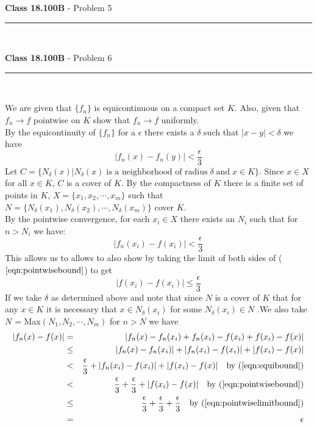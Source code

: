 \documentclass[11pt,reqno]{article}
\begin{document}
\vspace{15pt}
\begin{flushleft} 
\textbf{Class 18.100B} - Problem 5\\
\rule{500pt}{1pt}\\
\end{flushleft} 


\vspace{15pt}
\begin{flushleft} 
\textbf{Class 18.100B} - Problem 6\\
\rule{500pt}{1pt}\\
\end{flushleft} 

We are given that $\{ f_n \}$ is equicontinuous on a compact set $K$. Also, given that $f_n \to f$ pointwise on $K$ show that $f_n \to f$ uniformly.\\
By the equicontinuity of $\{ f_n \}$ for a $\epsilon$ there exists a $\delta$ such that $|x - y| < \delta$ we have
\begin{equation} 
|f_n(x) - f_n(y)| < \frac{\epsilon}{3} \label{eqn:equibound}
\end{equation}
Let $C = \{ N_\delta(x) | N_\delta(x) \; \text{is a neighborhood of radius} \; \delta \; \text{and} \; x \in K \} $. Since $x \in X$ for all $x \in K$, $C$ is a cover of $K$. By the compactness of $K$ there is a finite set of points in $K$, $X = \{ x_1, x_2, \cdots ,x_m \}$ such that $N = \{ N_\delta(x_1), N_\delta(x_2), \cdots, N_\delta(x_m) \}$ cover $K$. \\
By the pointwise convergence, for each $x_i \in X$ there exists an $N_i$ such that for $n > N_i$ we have:
\begin{equation}
|f_n(x_i) - f(x_i)| < \frac{\epsilon}{3} \label{eqn:pointwisebound}
\end{equation}
This allows us to allows to also show by taking the limit of both sides of ($\ref{eqn:pointwisebound}$) to get
\begin{equation}
|f(x_i) - f(x_i)| \le \frac{\epsilon}{3} \label{eqn:pointwiselimitbound}
\end{equation}
If we take $\delta$ as determined above and note that since $N$ is a cover of $K$ that for any $x \in K$ it is necessary that $x \in N_\delta(x_i)$ for some $N_\delta(x_i) \in N$ .We also take $N$ = Max$(N_1,N_2,\cdots,N_m)$ for $n > N$ we have 
\begin{eqnarray*}
|f_n(x) - f(x)| &=& |f_n(x) - f_n(x_i) + f_n(x_i) - f(x_i) + f(x_i) - f(x)| \\ 
		    &\le& |f_n(x) - f_n(x_i)| + |f_n(x_i) - f(x_i)| + |f(x_i) - f(x)| \\
		    &<& \frac{\epsilon}{3} + |f_n(x_i) - f(x_i)| + |f(x_i) - f(x)| \quad \text{by $(\ref{eqn:equibound})$} \\
		    &<& \frac{\epsilon}{3} + \frac{\epsilon}{3} + |f(x_i) - f(x)| \quad \text{by $(\ref{eqn:pointwisebound})$} \\
		    &\le& \frac{\epsilon}{3} + \frac{\epsilon}{3} +  \frac{\epsilon}{3}  \quad \text{by $(\ref{eqn:pointwiselimitbound})$} \\
		    &=& \epsilon
\end{eqnarray*}
\end{document}
